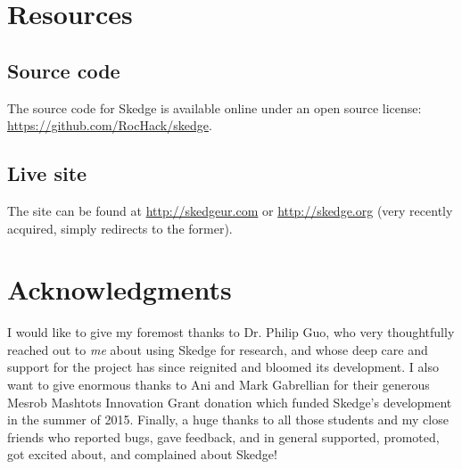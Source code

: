 \section{Resources}

\subsection*{Source code}

The source code for Skedge is available online under an open source license:\\
\url{https://github.com/RocHack/skedge}.

\subsection*{Live site}

\noindent The site can be found at \url{http://skedgeur.com} or \url{http://skedge.org} (very recently acquired, simply redirects to the former).


\section{Acknowledgments}

I would like to give my foremost thanks to Dr. Philip Guo, who very thoughtfully reached out to \emph{me} about using Skedge for research, and whose deep care and support for the project has since reignited and bloomed its development. I also want to give enormous thanks to Ani and Mark Gabrellian for their generous Mesrob Mashtots Innovation Grant donation which funded Skedge's development in the summer of 2015. Finally, a huge thanks to all those students and my close friends who reported bugs, gave feedback, and in general supported, promoted, got excited about, and complained about Skedge!